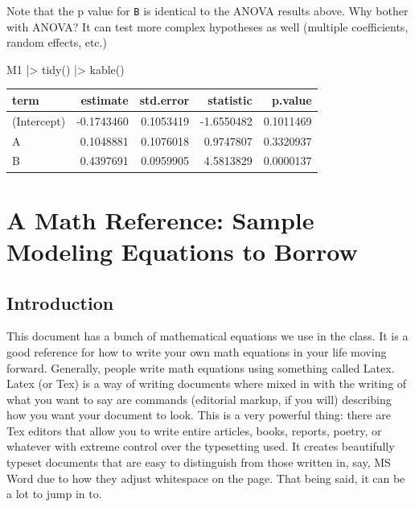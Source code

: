 \documentclass[
  letterpaper,
  DIV=11,
  numbers=noendperiod]{scrreprt}
\newenvironment{Shaded}{\begin{snugshade}}{\end{snugshade}}
\newcommand{\FunctionTok}[1]{\textcolor[rgb]{0.02,0.16,0.49}{#1}}
\newcommand{\NormalTok}[1]{\textcolor[rgb]{0.00,0.44,0.13}{#1}}
\newcommand{\SpecialCharTok}[1]{\textcolor[rgb]{0.25,0.44,0.63}{#1}}
\begin{document}
Note that the p value for \texttt{B} is identical to the ANOVA results
above. Why bother with ANOVA? It can test more complex hypotheses as
well (multiple coefficients, random effects, etc.)

\begin{Shaded}
\begin{Highlighting}[]
\NormalTok{M1 }\SpecialCharTok{|\textgreater{}} 
  \FunctionTok{tidy}\NormalTok{() }\SpecialCharTok{|\textgreater{}} 
  \FunctionTok{kable}\NormalTok{()}
\end{Highlighting}
\end{Shaded}

\begin{longtable}[]{@{}lrrrr@{}}
\toprule\noalign{}
term & estimate & std.error & statistic & p.value \\
\midrule\noalign{}
\endhead
\bottomrule\noalign{}
\endlastfoot
(Intercept) & -0.1743460 & 0.1053419 & -1.6550482 & 0.1011469 \\
A & 0.1048881 & 0.1076018 & 0.9747807 & 0.3320937 \\
B & 0.4397691 & 0.0959905 & 4.5813829 & 0.0000137 \\
\end{longtable}

\hypertarget{a-math-reference-sample-modeling-equations-to-borrow}{%
\chapter{A Math Reference: Sample Modeling Equations to
Borrow}\label{a-math-reference-sample-modeling-equations-to-borrow}}

\hypertarget{introduction}{%
\section{Introduction}\label{introduction}}

This document has a bunch of mathematical equations we use in the class.
It is a good reference for how to write your own math equations in your
life moving forward. Generally, people write math equations using
something called Latex. Latex (or Tex) is a way of writing documents
where mixed in with the writing of what you want to say are commands
(editorial markup, if you will) describing how you want your document to
look. This is a very powerful thing: there are Tex editors that allow
you to write entire articles, books, reports, poetry, or whatever with
extreme control over the typesetting used. It creates beautifully
typeset documents that are easy to distinguish from those written in,
say, MS Word due to how they adjust whitespace on the page. That being
said, it can be a lot to jump in to.
\end{document}
